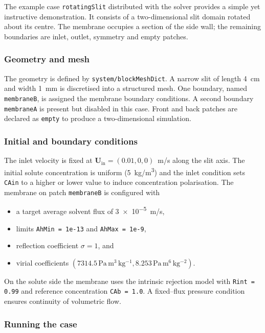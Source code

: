 \documentclass[11pt,a4paper]{article}
\begin{document}
The example case \texttt{rotatingSlit} distributed with the solver
provides a simple yet instructive demonstration.  It consists of a
two-dimensional slit domain rotated about its centre.  The membrane
occupies a section of the side wall; the remaining boundaries are
inlet, outlet, symmetry and empty patches.

\subsubsection*{Geometry and mesh}

The geometry is defined by \texttt{system/blockMeshDict}.  A narrow
slit of length \SI{4}{\centi\metre} and width \SI{1}{\milli\metre} is
discretised into a structured mesh.  One boundary, named
\texttt{membraneB}, is assigned the membrane boundary conditions.  A
second boundary \texttt{membraneA} is present but disabled in this
case.  Front and back patches are declared as \texttt{empty} to
produce a two-dimensional simulation.

\subsubsection*{Initial and boundary conditions}

The inlet velocity is fixed at $\mathbf{U}_\mathrm{in} = (0.01, 0, 0)$~m/s
along the slit axis.  The initial solute
concentration is uniform (\SI{5}{kg/m^3}) and the inlet condition sets
\texttt{CAin} to a higher or lower value to induce concentration
polarisation.  The membrane on patch \texttt{membraneB} is configured
with
\begin{itemize}
	\item a target average solvent flux of \SI{3e-5}{m/s},
	\item limits \texttt{AhMin = 1e-13} and \texttt{AhMax = 1e-9},
	\item reflection coefficient $\sigma=1$, and
	\item virial coefficients
	$(7314.5\,\mathrm{Pa\,m^3\,kg^{-1}},
	8.253\,\mathrm{Pa\,m^6\,kg^{-2}})$.
\end{itemize}
On the solute side the membrane uses the intrinsic rejection model with
\texttt{Rint = 0.99} and reference concentration \texttt{CAb = 1.0}.  A
fixed–flux pressure condition ensures continuity of volumetric flow.

\subsubsection*{Running the case}
\end{document}
